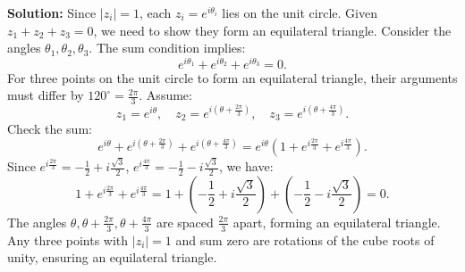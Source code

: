 \bigskip\noindent\textbf{Solution:}
Since \( |z_i| = 1 \), each \( z_i = e^{i\theta_i} \) lies on the unit circle. Given \( z_1 + z_2 + z_3 = 0 \), we need to show they form an equilateral triangle. Consider the angles \( \theta_1, \theta_2, \theta_3 \). The sum condition implies:
\[
e^{i\theta_1} + e^{i\theta_2} + e^{i\theta_3} = 0.
\]
For three points on the unit circle to form an equilateral triangle, their arguments must differ by \( 120^\circ = \frac{2\pi}{3} \). Assume:
\[
z_1 = e^{i\theta}, \quad z_2 = e^{i(\theta + \frac{2\pi}{3})}, \quad z_3 = e^{i(\theta + \frac{4\pi}{3})}.
\]
Check the sum:
\[
e^{i\theta} + e^{i(\theta + \frac{2\pi}{3})} + e^{i(\theta + \frac{4\pi}{3})} = e^{i\theta} \left( 1 + e^{i\frac{2\pi}{3}} + e^{i\frac{4\pi}{3}} \right).
\]
Since \( e^{i\frac{2\pi}{3}} = -\frac{1}{2} + i\frac{\sqrt{3}}{2} \), \( e^{i\frac{4\pi}{3}} = -\frac{1}{2} - i\frac{\sqrt{3}}{2} \), we have:
\[
1 + e^{i\frac{2\pi}{3}} + e^{i\frac{4\pi}{3}} = 1 + \left(-\frac{1}{2} + i\frac{\sqrt{3}}{2}\right) + \left(-\frac{1}{2} - i\frac{\sqrt{3}}{2}\right) = 0.
\]
The angles \( \theta, \theta + \frac{2\pi}{3}, \theta + \frac{4\pi}{3} \) are spaced \( \frac{2\pi}{3} \) apart, forming an equilateral triangle. Any three points with \( |z_i| = 1 \) and sum zero are rotations of the cube roots of unity, ensuring an equilateral triangle.

